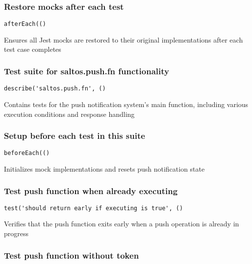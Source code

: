 \documentclass[a4paper]{article}
\begin{document}
\hypertarget{toc244}{}
\subsubsection{Restore mocks after each test}

\begin{lstlisting}
afterEach(()
\end{lstlisting}

Ensures all Jest mocks are restored to their original implementations
after each test case completes

\hypertarget{toc245}{}
\subsubsection{Test suite for saltos.push.fn functionality}

\begin{lstlisting}
describe('saltos.push.fn', ()
\end{lstlisting}

Contains tests for the push notification system's main function,
including various execution conditions and response handling

\hypertarget{toc246}{}
\subsubsection{Setup before each test in this suite}

\begin{lstlisting}
beforeEach(()
\end{lstlisting}

Initializes mock implementations and resets push notification state

\hypertarget{toc247}{}
\subsubsection{Test push function when already executing}

\begin{lstlisting}
test('should return early if executing is true', ()
\end{lstlisting}

Verifies that the push function exits early when a push operation
is already in progress

\hypertarget{toc248}{}
\subsubsection{Test push function without token}
\end{document}
